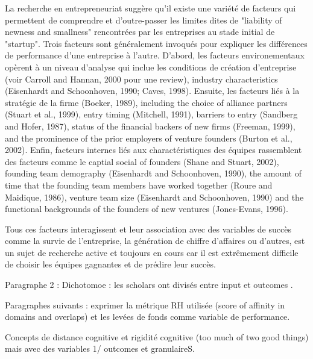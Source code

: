 \documentclass[12pt]{article}
\begin{document}
La recherche en entrepreneuriat suggère qu'il existe une variété de facteurs qui permettent de comprendre et d'outre-passer les limites dites de "liability of newness and smallness" rencontrées par les entreprises au stade initial de "startup". Trois facteurs sont généralement invoqués pour expliquer les différences de performance d'une entreprise à l'autre. D'abord, les facteurs environementaux opèrent à un niveau d'analyse qui inclue les conditions de création d'entreprise (voir Carroll and Hannan, 2000 pour une review), industry characteristics (Eisenhardt and Schoonhoven, 1990; Caves, 1998). Ensuite, les facteurs liés à la stratégie de la firme (Boeker, 1989), including the choice of alliance partners (Stuart et al., 1999), entry timing (Mitchell, 1991), barriers to entry (Sandberg and Hofer, 1987), status of the financial backers of new firms (Freeman, 1999), and the prominence of the prior employers of venture founders (Burton et al., 2002). Enfin, facteurs internes liés aux charactéristiques des équipes rassemblent des facteurs comme le captial social of founders (Shane and Stuart, 2002), founding team demography (Eisenhardt and Schoonhoven, 1990), the amount of time that the founding team members have worked together (Roure and Maidique, 1986), venture team size (Eisenhardt and Schoonhoven, 1990) and the functional backgrounds of the founders of new ventures (Jones-Evans, 1996).

Tous ces facteurs interagissent et leur association avec des variables de succès comme la survie de l'entreprise, la génération de chiffre d'affaires ou d'autres, est un sujet de recherche active et toujours en cours car il est extrêmement difficile de choisir les équipes gagnantes et de prédire leur succès.

Paragraphe 2 : Dichotomoe : les scholars ont divisés entre input et outcomes \citep{marvel2016human}.

Paragraphes suivants : exprimer la métrique RH utilisée (score of affinity in domains and overlaps) et les levées de fonds comme variable de performance.

Concepts de distance cognitive et rigidité cognitive (too much of two good things) mais avec des variables 1/ outcomes et granulaireS.
\end{document}
